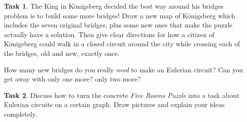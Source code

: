 \documentclass[12pt,letterpaper]{article}
\theoremstyle{definition}
\newtheorem{task}{Task}
\begin{document}
\begin{task}
The King in K\"{o}nigsberg decided the best way around his bridges problem is to build some more bridges! Draw a 
new map of K\"{o}nigsberg which includes the seven original bridges, plus some new ones that make the puzzle
actually have a solution. Then give clear directions for how a citizen of K\"{o}nigsberg could walk in a closed circuit
around the city while crossing each of the bridges, old and new, exactly once.

How many new bridges do you really \emph{need} to make an Eulerian circuit? Can you get away with only one more? only two more?
\end{task}

\begin{task}
Discuss how to turn the concrete \emph{Five Rooms Puzzle} into a task about Eulerian circuits on a certain graph. Draw pictures and explain your ideas completely.
\end{task}
\end{document}
